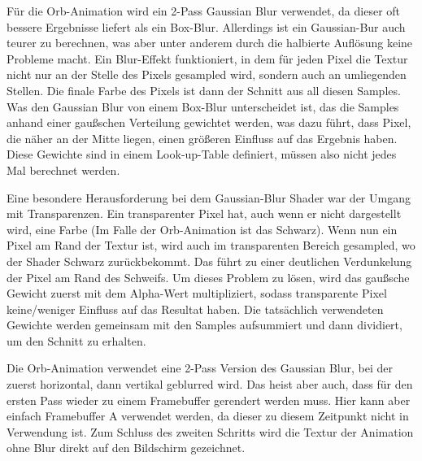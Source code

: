 Für die Orb-Animation wird ein 2-Pass Gaussian Blur verwendet, da dieser oft bessere Ergebnisse liefert als \zB ein
Box-Blur.\cite{gaussianBlur}
Allerdings ist ein Gaussian-Bur auch teurer zu berechnen, was aber unter anderem durch die halbierte Auflösung keine
Probleme macht.
Ein Blur-Effekt funktioniert, in dem für jeden Pixel die Textur nicht nur an der Stelle des Pixels gesampled wird,
sondern auch an umliegenden Stellen.
Die finale Farbe des Pixels ist dann der Schnitt aus all diesen Samples.
Was den Gaussian Blur von \ua einem Box-Blur unterscheidet ist, das die Samples anhand einer gaußschen Verteilung
gewichtet werden, was dazu führt, dass Pixel, die näher an der Mitte liegen, einen größeren Einfluss auf das Ergebnis
haben.\cite{gaussianBlur}
Diese Gewichte sind in einem Look-up-Table definiert, müssen also nicht jedes Mal berechnet werden.

Eine besondere Herausforderung bei dem Gaussian-Blur Shader war der Umgang mit Transparenzen.
Ein transparenter Pixel hat, auch wenn er nicht dargestellt wird, eine Farbe (Im Falle der Orb-Animation ist das Schwarz).
Wenn nun ein Pixel am Rand der Textur ist, wird auch im transparenten Bereich gesampled,
wo der Shader Schwarz zurückbekommt.
Das führt zu einer deutlichen Verdunkelung der Pixel am Rand des Schweifs.
Um dieses Problem zu lösen, wird das gaußsche Gewicht zuerst mit dem Alpha-Wert multipliziert, sodass transparente Pixel
keine/weniger Einfluss auf das Resultat haben.
Die tatsächlich verwendeten Gewichte werden gemeinsam mit den Samples aufsummiert und dann dividiert, um den Schnitt zu
erhalten.

Die Orb-Animation verwendet eine 2-Pass Version des Gaussian Blur, bei der zuerst horizontal, dann vertikal geblurred
wird.
Das heist aber auch, dass für den ersten Pass wieder zu einem Framebuffer gerendert werden muss.
Hier kann aber einfach Framebuffer A verwendet werden, da dieser zu diesem Zeitpunkt nicht in Verwendung ist.
Zum Schluss des zweiten Schritts wird die Textur der Animation ohne Blur direkt auf den Bildschirm gezeichnet.

\renewcommand{\kapitelautor}{}
